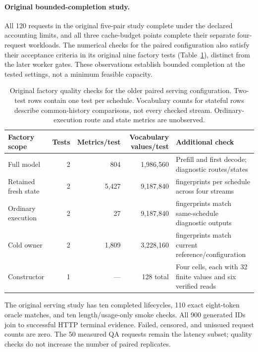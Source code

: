 \paragraph{Original bounded-completion study.}
All 120 requests in the original five-pair study complete under the declared accounting
limits, and all three cache-budget points complete their separate four-request
workloads. The numerical checks for the paired configuration also satisfy
their acceptance criteria in its original nine factory tests
(Table~\ref{tab:enabled-quality}), distinct from the later worker gates. These observations establish bounded
completion at the tested settings, not a minimum feasible capacity.

\begin{table}[!htbp]
\centering
\small
\begin{tabularx}{\linewidth}{@{}lrrr>{\raggedright\arraybackslash}X@{}}
\toprule
Factory scope & Tests & Metrics/test & Vocabulary values/test & Additional check \\
\midrule
Full model & 2 & 804 & 1,986,560 & Prefill and first decode; diagnostic routes/states \\
Retained fresh state & 2 & 5,427 & 9,187,840 & 64 fingerprints per schedule across four streams \\
Ordinary execution & 2 & 27 & 9,187,840 & 64 fingerprints match same-schedule diagnostic outputs \\
Cold owner & 2 & 1,809 & 3,228,160 & 28 fingerprints match current reference/configuration \\
Constructor & 1 & --- & 128 total & Four cells, each with 32 finite values and six verified reads \\
\bottomrule
\end{tabularx}
\caption{Original factory quality checks for the older paired serving configuration.
Two-test rows contain one test per schedule. Vocabulary counts for stateful
rows describe common-history comparisons, not every checked stream.
Ordinary-execution route and state metrics are unobserved.}
\label{tab:enabled-quality}
\end{table}

The original serving study has ten completed lifecycles, 110 exact eight-token oracle
matches, and ten length/usage-only smoke checks. All 900 generated IDs join
to successful HTTP terminal evidence. Failed, censored, and unissued request
counts are zero. The 50 measured QA requests remain the latency subset;
quality checks do not increase the number of paired replicates.


